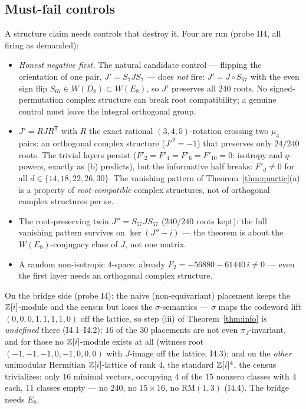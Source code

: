 \subsection{Must-fail controls}
A structure claim needs controls that destroy it.  Four are run
(probe II4, all firing as demanded):
\begin{itemize}
\item[(0)] \emph{Honest negative first.}  The natural candidate
control --- flipping the orientation of one pair,
$J'=S_7JS_7$ --- does \emph{not} fire: $J'=J\circ S_{67}$ with the
even sign flip $S_{67}\in W(D_8)\subset W(E_8)$, so $J'$ preserves
all $240$ roots.  No signed-permutation complex structure can break
root compatibility; a genuine control must leave the integral
orthogonal group.
\item[(a)] $J'=RJR^{\mathsf T}$ with $R$ the exact rational
$(3,4,5)$-rotation crossing two $\mu_4$ pairs: an orthogonal complex
structure ($J'^2=-1$) that preserves only $24/240$ roots.  The
trivial layers persist ($F'_2=F'_4=F'_6=F'_{10}=0$: isotropy and
$q$-powers, exactly as (b) predicts), but the informative half
breaks: $F'_d\neq0$ for all $d\in\{14,18,22,26,30\}$.  The vanishing
pattern of Theorem~\ref{thm:quartic}(a) is a property of
\emph{root-compatible} complex structures, not of orthogonal complex
structures per se.
\item[(b)] The root-preserving twin $J''=S_{57}JS_{57}$
($240/240$ roots kept): the full vanishing pattern survives on
$\ker(J''-i)$ --- the theorem is about the $W(E_8)$-conjugacy class
of $J$, not one matrix.
\item[(c)] A random non-isotropic $4$-space: already
$F_2=-56880-61440\,i\neq0$ --- even the first layer needs an
orthogonal complex structure.
\end{itemize}
On the bridge side (probe I4): the naive (non-equivariant) placement
keeps the $\mathbb Z[i]$-module and the census but loses the
$\sigma$-semantics --- $\sigma$ maps the codeword lift
$(0,0,0,1,1,1,1,0)$ off the lattice, so step (iii) of
Theorem~\ref{thm:info} is \emph{undefined} there (I4.1--I4.2);
$16$ of the $30$ placements are not even $\pi_J$-invariant, and for
those no $\mathbb Z[i]$-module exists at all (witness root
$(-1,-1,-1,0,-1,0,0,0)$ with $J$-image off the lattice, I4.3); and on
the \emph{other} unimodular Hermitian $\mathbb Z[i]$-lattice of rank $4$,
the standard $\mathbb Z[i]^4$, the census trivializes: only $16$ minimal
vectors, occupying $4$ of the $15$ nonzero classes with $4$ each,
$11$ classes empty --- no $240$, no $15\times16$, no
$\mathrm{RM}(1,3)$ (I4.4).  The bridge needs $E_8$.

